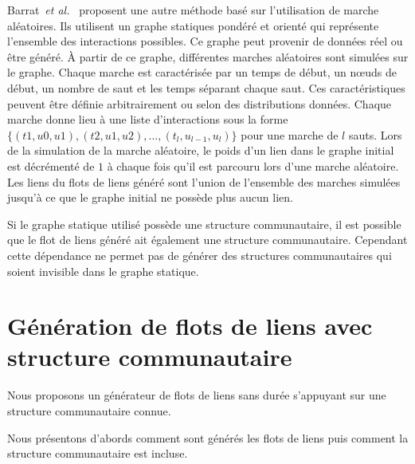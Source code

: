 Barrat~\emph{et al.}~\cite{Barrat2013a} proposent une autre méthode basé sur l'utilisation de marche aléatoires.
Ils utilisent un graphe statiques pondéré et orienté qui représente l'ensemble des interactions possibles.
Ce graphe peut provenir de données réel ou être généré.
\`A partir de ce graphe, différentes marches aléatoires sont simulées sur le graphe.
Chaque marche est caractérisée par un temps de début, un n\oe uds de début, un nombre de saut et les temps séparant chaque saut.
Ces caractéristiques peuvent être définie arbitrairement ou selon des distributions données.
Chaque marche donne lieu à une liste d'interactions sous la forme $\{(t1,u0,u1), (t2,u1,u2), ..., (t_l,u_{l-1}, u_l)\}$ pour une marche de $l$ sauts.
Lors de la simulation de la marche aléatoire, le poids d'un lien dans le graphe initial est décrémenté de $1$ à chaque fois qu'il est parcouru lors d'une marche aléatoire.
Les liens du flots de liens généré sont l'union de l'ensemble des marches simulées jusqu'à ce que le graphe initial ne possède plus aucun lien.

Si le graphe statique utilisé possède une structure communautaire, il est possible que le flot de liens généré ait également une structure communautaire.
Cependant cette dépendance ne permet pas de générer des structures communautaires qui soient invisible dans le graphe statique.


\section{Génération de flots de liens avec structure communautaire}
\label{sec:versqualite_methode}

Nous proposons un générateur de flots de liens sans durée s'appuyant sur une structure communautaire connue.


Nous présentons d'abords comment sont générés les flots de liens puis comment la structure communautaire est incluse.

